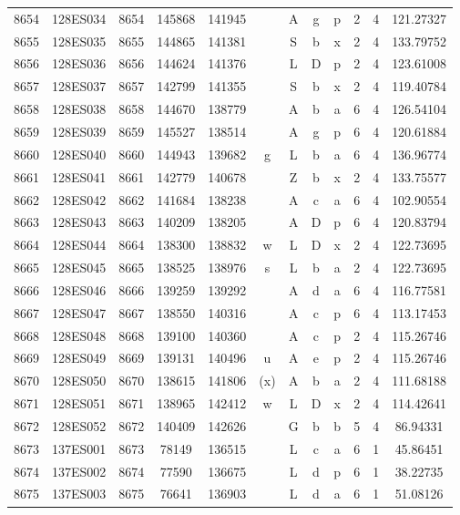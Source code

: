 \begin{tabular}{|*{12}{c|}}
8654 & 128ES034 & 8654 & 145868 & 141945 &  & A & g & p & 2 & 4 & 121.27327 \\ 
8655 & 128ES035 & 8655 & 144865 & 141381 &  & S & b & x & 2 & 4 & 133.79752 \\ 
8656 & 128ES036 & 8656 & 144624 & 141376 &  & L & D & p & 2 & 4 & 123.61008 \\ 
8657 & 128ES037 & 8657 & 142799 & 141355 &  & S & b & x & 2 & 4 & 119.40784 \\ 
8658 & 128ES038 & 8658 & 144670 & 138779 &  & A & b & a & 6 & 4 & 126.54104 \\ 
8659 & 128ES039 & 8659 & 145527 & 138514 &  & A & g & p & 6 & 4 & 120.61884 \\ 
8660 & 128ES040 & 8660 & 144943 & 139682 & g & L & b & a & 6 & 4 & 136.96774 \\ 
8661 & 128ES041 & 8661 & 142779 & 140678 &  & Z & b & x & 2 & 4 & 133.75577 \\ 
8662 & 128ES042 & 8662 & 141684 & 138238 &  & A & c & a & 6 & 4 & 102.90554 \\ 
8663 & 128ES043 & 8663 & 140209 & 138205 &  & A & D & p & 6 & 4 & 120.83794 \\ 
8664 & 128ES044 & 8664 & 138300 & 138832 & w & L & D & x & 2 & 4 & 122.73695 \\ 
8665 & 128ES045 & 8665 & 138525 & 138976 & s & L & b & a & 2 & 4 & 122.73695 \\ 
8666 & 128ES046 & 8666 & 139259 & 139292 &  & A & d & a & 6 & 4 & 116.77581 \\ 
8667 & 128ES047 & 8667 & 138550 & 140316 &  & A & c & p & 6 & 4 & 113.17453 \\ 
8668 & 128ES048 & 8668 & 139100 & 140360 &  & A & c & p & 2 & 4 & 115.26746 \\ 
8669 & 128ES049 & 8669 & 139131 & 140496 & u & A & e & p & 2 & 4 & 115.26746 \\ 
8670 & 128ES050 & 8670 & 138615 & 141806 & (x) & A & b & a & 2 & 4 & 111.68188 \\ 
8671 & 128ES051 & 8671 & 138965 & 142412 & w & L & D & x & 2 & 4 & 114.42641 \\ 
8672 & 128ES052 & 8672 & 140409 & 142626 &  & G & b & b & 5 & 4 & 86.94331 \\ 
8673 & 137ES001 & 8673 & 78149 & 136515 &  & L & c & a & 6 & 1 & 45.86451 \\ 
8674 & 137ES002 & 8674 & 77590 & 136675 &  & L & d & p & 6 & 1 & 38.22735 \\ 
8675 & 137ES003 & 8675 & 76641 & 136903 &  & L & d & a & 6 & 1 & 51.08126 \\ 

\end{tabular}
